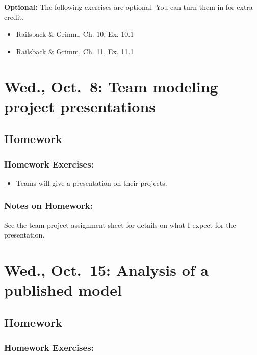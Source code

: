\documentclass[
]{article}
\providecommand{\tightlist}{%
  \setlength{\itemsep}{0pt}\setlength{\parskip}{0pt}}
\begin{document}
\textbf{Optional:} The following exercises are optional. You can turn
them in for extra credit.

\begin{itemize}
\tightlist
\item
  Railsback \& Grimm, Ch. 10, Ex. 10.1
\item
  Railsback \& Grimm, Ch. 11, Ex. 11.1
\end{itemize}

\section{Wed., Oct.~8: Team modeling project
presentations}\label{wed.-oct.-8-team-modeling-project-presentations}

\subsection{Homework}\label{homework-9}

\subsubsection{Homework Exercises:}\label{homework-exercises-9}

\begin{itemize}
\tightlist
\item
  Teams will give a presentation on their projects.
\end{itemize}

\subsubsection{Notes on Homework:}\label{notes-on-homework-5}

See the team project assignment sheet for details on what I expect for
the presentation.

\section{Wed., Oct.~15: Analysis of a published
model}\label{wed.-oct.-15-analysis-of-a-published-model}

\subsection{Homework}\label{homework-10}

\subsubsection{Homework Exercises:}\label{homework-exercises-10}
\end{document}
